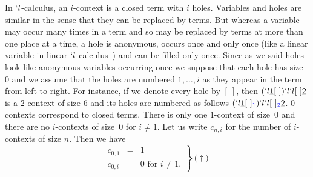\documentclass{jfp1}
\newcommand{\Var}[1]{\underline{\mathsf{#1}}}
\newcommand{\bl}[1]{\textcolor{blue}{#1}}
\begin{document}
In $`l$-calculus, an $i$-context is a closed term with $i$ holes.  Variables and
holes are similar in the sense that they can be replaced by terms.  But whereas a
variable may occur many times in a term and so may be replaced by terms at more than
one place at a time, a hole is anonymous, occurs once and only once (like a linear
variable in linear $`l$-calculus~\cite{DBLP:journals/corr/abs-cs-0501035}) and can be
filled only once.  Since as we said holes look like anonymous variables occurring
once we suppose that each hole has size~$0$ and we assume that the holes are numbered
$1, \ldots, i$ as they appear in the term from left to right.  For instance, if we
denote every hole by $[\ ]$, then $(`l \Var{1} [\ ])`l `l [\ ]\Var{2}$ is a
$2$-context of size $6$ and its holes are numbered as follows $(`l \Var{1} [\
]_{\bl{1}})`l `l [\ ]_{\bl{2}}\Var{2}$. $0$-contexts correspond to closed terms.
There is only one $1$-context of size~$0$ and there are no $i$-contexts of size~$0$
for $i\neq 1$.  Let us write $c_{n,i}$ for the number of $i$-contexts of size $n$.
Then we have
\begin{displaymath}
\left.\begin{array}{rcl}
c_{0,1} &=& 1\\
c_{0,i} &=& 0 \textrm{~for~} i \neq 1.
\end{array}\right\}(\dagger)
\end{displaymath}
\end{document}
